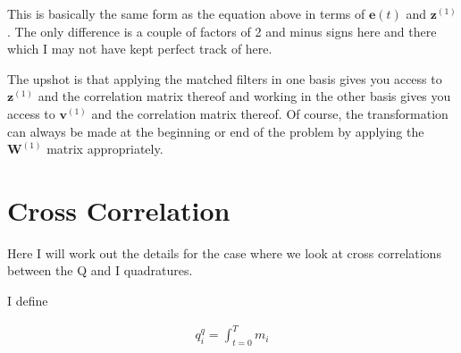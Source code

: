 \documentclass[12pt]{article}
\newcommand{\bv}[1]{\boldsymbol{#1}}
\begin{document}
This is basically the same form as the equation above in terms of $\bv{e}(t)$ and $\bv{z}^{(1)}$. The only difference is a couple of factors of 2 and minus signs here and there which I may not have kept perfect track of here.

The upshot is that applying the matched filters in one basis gives you access to $\bv{z}^{(1)}$ and the correlation matrix thereof and working in the other basis gives you access to $\bv{v}^{(1)}$ and the correlation matrix thereof. Of course, the transformation can always be made at the beginning or end of the problem by applying the $\bv{W}^{(1)}$ matrix appropriately.

\section{Cross Correlation}

Here I will work out the details for the case where we look at cross correlations between the Q and I quadratures.

I define

\begin{align}
q^q_i = \int_{t=0}^T m_i
\end{align}
\end{document}
